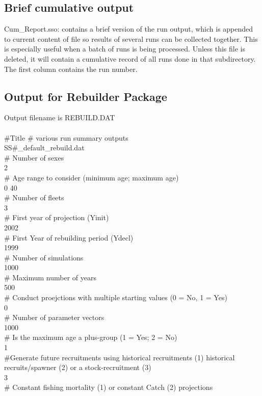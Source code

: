 \subsection{Brief cumulative output}
Cum\_Report.sso:  contains a brief version of the run output, which is appended to current content of file so results of several runs can be collected together.  This is especially useful when a batch of runs is being processed.  Unless this file is deleted, it will contain a cumulative record of all runs done in that subdirectory.  The first column contains the run number.  

\subsection{Output for Rebuilder Package}
Output filename is REBUILD.DAT\\
\\
\#Title  \# various run summary outputs\\
SS\#\_default\_rebuild.dat\\
\# Number of sexes\\
2\\
\# Age range to consider (minimum age; maximum age)\\
0 40\\
\# Number of fleets\\
3\\
\# First year of projection (Yinit)\\
2002\\
\# First Year of rebuilding period (Ydecl)\\
1999\\
\# Number of simulations\\
1000\\
\# Maximum number of years\\
500\\
\# Conduct proejctions with multiple starting values (0 = No, 1 = Yes)\\
0\\
\# Number of parameter vectors\\
1000\\
\# Is the maximum age a plus-group (1 = Yes; 2 = No)\\
1\\
\#Generate future recruitments using historical recruitments (1) historical recruits/spawner (2)  or a stock-recruitment (3)\\
3\\
\# Constant fishing mortality (1) or constant Catch (2) projections\\
